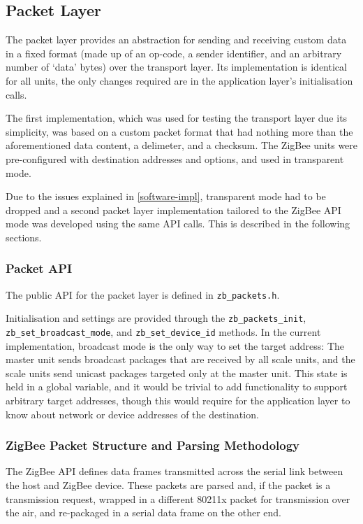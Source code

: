\subsection{Packet Layer}
The packet layer provides an abstraction for sending and receiving custom data in a fixed format (made up of an op-code, a sender identifier, and an arbitrary number of `data' bytes) over the transport layer. Its implementation is identical for all units, the only changes required are in the application layer's initialisation calls.

The first implementation, which was used for testing the transport layer due its simplicity, was based on a custom packet format that had nothing more than the aforementioned data content, a delimeter, and a checksum. The ZigBee units were pre-configured with destination addresses and options, and used in transparent mode.

Due to the issues explained in \ref{software-impl}, transparent mode had to be dropped and a second packet layer implementation tailored to the ZigBee API mode was developed using the same API calls. This is described in the following sections.

\subsubsection{Packet API}
The public API for the packet layer is defined in \texttt{zb\_packets.h}. 

Initialisation and settings are provided through the \texttt{zb\_packets\_init}, \texttt{zb\_set\_broadcast\_mode}, and \texttt{zb\_set\_device\_id} methods. In the current implementation, broadcast mode is the only way to set the target address: The master unit sends broadcast packages that are received by all scale units, and the scale units send unicast packages targeted only at the master unit. This state is held in a global variable, and it would be trivial to add functionality to support arbitrary target addresses, though this would require for the application layer to know about network or device addresses of the destination.


\subsubsection{ZigBee Packet Structure and Parsing Methodology}
The ZigBee API defines data frames transmitted across the serial link between the host and ZigBee device. These packets are parsed and, if the packet is a transmission request, wrapped in a different 80211x packet for transmission over the air, and re-packaged in a serial data frame on the other end.

